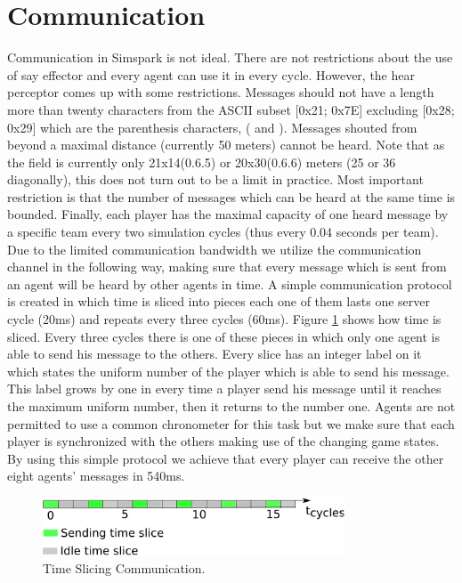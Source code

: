 \section{Communication}
Communication in Simspark is not ideal. There are not restrictions about the use of say effector and every agent can use it in every cycle. However, the hear perceptor comes up with some restrictions. Messages should not have a length more than twenty characters from the ASCII subset [0x21; 0x7E] excluding [0x28; 0x29] which are the parenthesis characters, ( and ). Messages shouted from beyond a maximal distance (currently 50 meters) cannot be heard. Note that as the field is currently only 21x14(0.6.5) or 20x30(0.6.6) meters (25 or 36 diagonally), this does not turn out to be a limit in practice. Most important restriction is that the number of messages which can be heard at the same time is bounded. Finally, each player has the maximal capacity of one heard message by a specific team every two simulation cycles (thus every 0.04 seconds per team). Due to the limited communication bandwidth we utilize the communication channel in the following way, making sure that every message which is sent from an agent will be heard by other agents in time. A simple communication protocol is created in which time is sliced into pieces each one of them lasts one server cycle (20ms) and repeats every three cycles (60ms). Figure \ref{fig:TimeSlicing} shows how time is sliced. Every three cycles there is one of these pieces in which only one agent is able to send his message to the others. Every slice has an integer label on it which states the uniform number of the player which is able to send his message. This label grows by one in every time a player send his message until it reaches the maximum uniform number, then it returns to the number one. Agents are not permitted to use a common chronometer for this task but we make sure that each player is synchronized with the others making use of the changing game states. By using this simple protocol we achieve that every player can receive the other eight agents' messages in 540ms.
\begin{figure}[!h]
\centering
  \includegraphics[width=0.8\textwidth]{Chapter3/figures/MAC.pdf}  
  \caption{Time Slicing Communication.}
  \label{fig:TimeSlicing}
\end{figure} 



